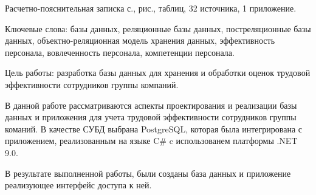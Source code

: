 
Расчетно-пояснительная записка \pageref{LastPage} с., \totalfigures{} рис., \totaltables{} таблиц, 32 источника, 1 приложение.

Ключевые слова: базы данных, реляционные базы данных, постреляционные базы данных, объектно-реляционная модель хранения данных, эффективность персонала, вовлеченность персонала, компетенции персонала.

Цель работы: разработка базы данных для хранения и обработки оценок трудовой эффективности сотрудников группы компаний.

В данной работе рассматриваются аспекты проектирования и реализации базы данных и приложения для учета трудовой эффективности сотрудников группы команий. В качестве СУБД выбрана PostgreSQL, которая была интегрирована с приложением, реализованным на языке C\# c использованем платформы .NET 9.0.

В результате выполненной работы, были созданы база данных и приложение реализующее интерфейс доступа к ней.